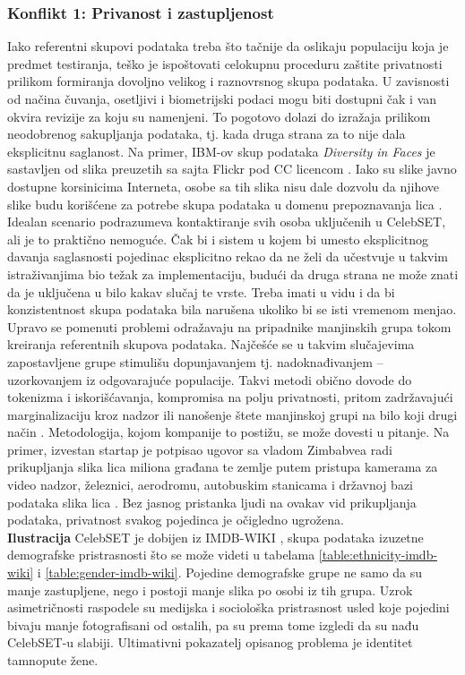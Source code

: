 \documentclass[11pt, a4paper]{article}
\begin{document}
\subsubsection{Konflikt 1: Privanost i zastupljenost}
Iako referentni skupovi podataka treba što tačnije da oslikaju populaciju koja je predmet testiranja, teško je ispoštovati celokupnu proceduru zaštite privatnosti prilikom formiranja dovoljno velikog i raznovrsnog skupa podataka. U zavisnosti od načina čuvanja, osetljivi i biometrijski podaci mogu biti dostupni čak i van okvira revizije za koju su namenjeni. To pogotovo dolazi do izražaja prilikom neodobrenog sakupljanja podataka, tj. kada druga strana za to nije dala eksplicitnu saglanost. Na primer, IBM-ov skup podataka \textit{Diversity in Faces} je sastavljen od slika preuzetih sa sajta Flickr pod CC licencom \cite{G32}. Iako su slike javno dostupne korsinicima Interneta, osobe sa tih slika nisu dale dozvolu da njihove slike budu korišćene za potrebe skupa podataka u domenu prepoznavanja lica \cite{G44}. Idealan scenario podrazumeva kontaktiranje svih osoba uključenih u CelebSET, ali je to praktično nemoguće. Čak bi i sistem u kojem bi umesto eksplicitnog davanja saglasnosti pojedinac eksplicitno rekao da ne želi da učestvuje u takvim istraživanjima bio težak za implementaciju, budući da druga strana ne može znati da je uključena u bilo kakav slučaj te vrste. Treba imati u vidu i da bi konzistentnost skupa podataka bila narušena ukoliko bi se isti vremenom menjao. \\
\indent Upravo se pomenuti problemi odražavaju na pripadnike manjinskih grupa tokom kreiranja referentnih skupova podataka. Najčešće se u takvim slučajevima zapostavljene grupe stimulišu dopunjavanjem tj. nadoknađivanjem -- uzorkovanjem iz odgovarajuće populacije. Takvi metodi obično dovode do tokenizma i iskorišćavanja, kompromisa na polju privatnosti, pritom zadržavajući marginalizaciju kroz nadzor ili nanošenje štete manjinskoj grupi na bilo koji drugi način \cite{G22, G25, G35}. Metodologija, kojom kompanije to postižu, se može dovesti u pitanje. Na primer, izvestan startap je potpisao ugovor sa vladom Zimbabvea radi prikupljanja slika lica miliona građana te zemlje putem pristupa kamerama za video nadzor, železnici, aerodromu, autobuskim stanicama i državnoj bazi podataka slika lica \cite{G23}. Bez jasnog pristanka ljudi na ovakav vid prikupljanja podataka, privatnost svakog pojedinca je očigledno ugrožena. \\
\indent\textbf{Ilustracija} CelebSET je dobijen iz IMDB-WIKI \cite{G40}, skupa podataka izuzetne demografske pristrasnosti što se može videti u tabelama \ref{table:ethnicity-imdb-wiki} i \ref{table:gender-imdb-wiki}. Pojedine demografske grupe ne samo da su manje zastupljene, nego i postoji manje slika po osobi iz tih grupa. Uzrok asimetričnosti raspodele su medijska i sociološka pristrasnost usled koje pojedini bivaju manje fotografisani od ostalih, pa su prema tome izgledi da su nađu CelebSET-u slabiji. Ultimativni pokazatelj opisanog problema je identitet tamnopute žene. \\
\end{document}
